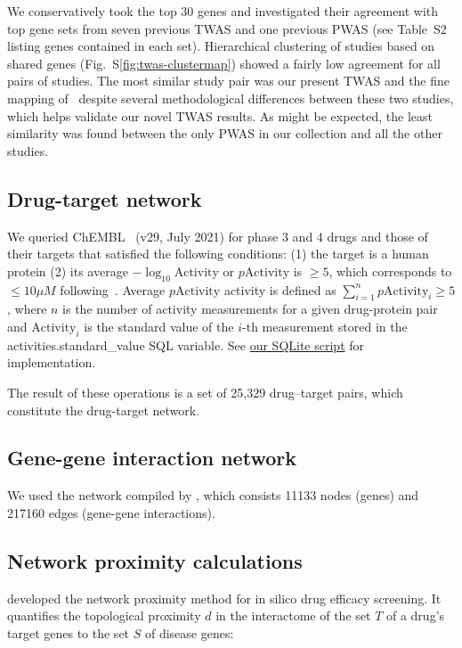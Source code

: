 \documentclass[letterpaper]{article}
\begin{document}
We conservatively took the top 30 genes and investigated their agreement with
top gene sets from seven previous TWAS and one previous PWAS (see Table~S2
listing genes contained in each set).  Hierarchical clustering of studies
based on shared genes (Fig.~S\ref{fig:twas-clustermap}) showed a fairly low
agreement for all pairs of studies.  The most similar study pair was our
present TWAS and the fine mapping of~\cite{Jansen2019} despite several
methodological differences between these two studies, which helps validate our
novel TWAS results.  As might be expected, the least similarity was found
between the only PWAS in our collection and all the other studies.

\subsection{Drug-target network}

We queried ChEMBL~\citep{Gaulton2017} (v29, July 2021) for phase 3 and 4 drugs
and those of their targets that satisfied the following conditions: (1) the
target is a human protein (2) its average $-\log_{10}\mathrm{Activity}$ or
$p\mathrm{Activity}$ is $\ge 5$, which corresponds to $\le 10 \mu M$
following~\cite{Cheng2018}.  Average $p\mathrm{Activity}$ activity is defined
as $\sum_{i=1}^n p\mathrm{Activity}_i \ge 5$, where $n$ is the number of
activity measurements for a given drug-protein pair and $\mathrm{Activity}_i$
is the standard value of the $i$-th measurement stored in the
activities.standard\_value SQL variable.  See
\href{https://github.com/attilagk/CTNS-notebook/blob/main/2021-10-24-chembl-query/drug_target_avg_activity.sql}{our SQLite script} for implementation.

The result of these operations is a set of 25,329 drug--target pairs, which constitute
the drug-target network.

\subsection{Gene-gene interaction network}

We used the network compiled by \cite{Cheng2019}, which consists 11133 nodes
(genes) and 217160 edges (gene-gene interactions).

\subsection{Network proximity calculations}

\cite{Guney2016} developed the network proximity method for in silico drug efficacy screening.  It
quantifies the topological proximity $d$ in the interactome of the set $T$ of a drug's target genes
to the set $S$ of disease genes: 
\end{document}

